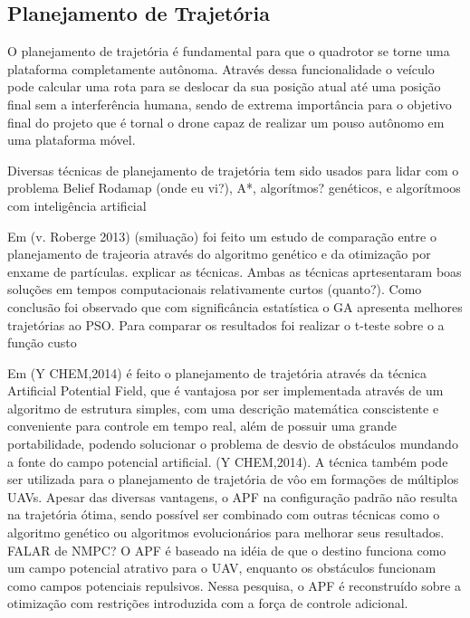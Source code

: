 \subsection{Planejamento de Trajetória}
O planejamento de trajetória é fundamental para que o quadrotor se torne uma plataforma completamente autônoma. Através dessa funcionalidade o veículo pode calcular uma rota para se deslocar da sua posição atual até uma posição final sem a interferência humana, sendo de extrema importância para o objetivo final do projeto que é tornal o drone capaz de realizar um pouso autônomo em uma plataforma móvel.

Diversas técnicas de planejamento de trajetória tem sido usados para lidar com o problema Belief Rodamap (onde eu vi?), A*, algorítmos? genéticos, e algorítmoos com inteligência artificial

Em (v. Roberge 2013) (smiluação) foi feito um estudo de comparação entre o planejamento de trajeoria através do algoritmo genético e da otimização por enxame de partículas. explicar as técnicas.
Ambas as técnicas aprtesentaram boas soluções em tempos computacionais relativamente curtos (quanto?). Como conclusão foi observado que com significância estatística o GA apresenta melhores trajetórias ao PSO. Para comparar os resultados foi realizar o t-teste sobre o a função custo

Em (Y CHEM,2014) é feito o planejamento de trajetória através da técnica Artificial Potential Field, que é vantajosa por ser implementada através de um algoritmo de estrutura simples, com uma descrição matemática conscistente e conveniente para controle em tempo real, além de possuir uma grande portabilidade, podendo solucionar o problema de desvio de obstáculos mundando a fonte do campo potencial artificial. (Y CHEM,2014). A técnica também pode ser utilizada para o planejamento de trajetória de vôo em formações de múltiplos UAVs. Apesar das diversas vantagens, o APF na configuração padrão não resulta na trajetória ótima, sendo possível ser combinado com outras técnicas como o algoritmo genético ou algoritmos evolucionários para melhorar seus resultados. FALAR de NMPC? O APF é baseado na idéia de que o destino funciona como um campo potencial atrativo para o UAV, enquanto os obstáculos funcionam como campos potenciais repulsivos. Nessa pesquisa, o APF é reconstruído sobre a otimização com restrições introduzida com a força de controle adicional.

